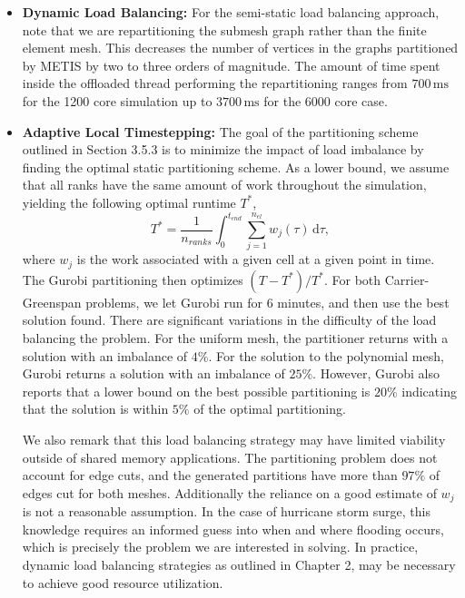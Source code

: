 \documentclass[10pt,letterpaper]{article}
\begin{document}
\begin{itemize}
\item {\bf Dynamic Load Balancing:} For the semi-static load balancing approach, note that we are repartitioning the submesh graph rather than the finite element mesh. This decreases the number of vertices in the graphs partitioned by METIS by two to three orders of magnitude. The amount of time spent inside the offloaded thread performing the repartitioning ranges from $700\,\mathrm{ms}$ for the 1200 core simulation up to $3700\,\mathrm{ms}$ for the 6000 core case.

\item {\bf Adaptive Local Timestepping:} The goal of the partitioning scheme outlined in Section 3.5.3 is to minimize the impact of load imbalance by finding the optimal static partitioning scheme.
As a lower bound, we assume that all ranks have the same amount of work throughout the simulation, yielding the following optimal runtime $T^*$,
\begin{equation*}
T^* = \frac{1}{n_{ranks}} \int_0^{t_{end}} \sum_{j=1}^{n_{el}} w_j(\tau) \,\mathrm{d}\tau,
\end{equation*}
where $w_j$ is the work associated with a given cell at a given point in time. The Gurobi partitioning then optimizes $(T - T^*)/T^*$. For both Carrier-Greenspan problems, we let Gurobi run for 6 minutes, and then use the best solution found. There are significant variations in the difficulty of the load balancing the problem. For the uniform mesh, the partitioner returns with a solution with an imbalance of $4\%$. For the solution to the polynomial mesh, Gurobi returns a solution with an imbalance of $25\%$. However, Gurobi also reports that a lower bound on the best possible partitioning is $20\%$ indicating that the solution is within $5\%$ of the optimal partitioning.

We also remark that this load balancing strategy may have limited viability outside of shared memory applications. The partitioning problem does not account for edge cuts, and the generated partitions have more than $97\%$ of edges cut for both meshes.
Additionally the reliance on a good estimate of $w_j$ is not a reasonable assumption. In the case of hurricane storm surge, this knowledge requires an informed guess into when and where flooding occurs, which is precisely the problem we are interested in solving. In practice, dynamic load balancing strategies as outlined in Chapter 2, may be necessary to achieve good resource utilization.
\end{itemize}




\end{document}
